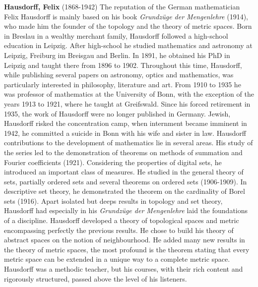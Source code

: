 \textbf{Hausdorff, Felix} (1868-1942) The reputation of the German mathematician Felix Hausdorff is mainly based on his book \textit{Grundzüge der Mengenlehre} (1914), who made him the founder of the topology and the theory of metric spaces. Born in Breslau in a wealthy merchant family, Hausdorff followed a high-school education in Leipzig. After high-school he studied mathematics and astronomy at Leipzig, Freiburg im Breisgau and Berlin. In 1891, he obtained his PhD in Leipzig and taught there from 1896 to 1902. Throughout this time, Hausdorff, while publishing several papers on astronomy, optics and mathematics, was particularly interested in philosophy, literature and art. From 1910 to 1935 he was professor of mathematics at the University of Bonn, with the exception of the years 1913 to 1921, where he taught at Greifswald. Since his forced retirement in 1935, the work of Hausdorff were no longer published in Germany. Jewish, Hausdorff risked the concentration camp, when internment became imminent in 1942, he committed a suicide in Bonn with his wife and sister in law. Hausdorff contributions to the development of mathematics lie in several areas. His study of the series led to the demonstration of theorems on methods of summation and Fourier coefficients (1921). Considering the properties of digital sets, he introduced an important class of measures. He studied in the general theory of sets, partially ordered sets and several theorems on ordered sets (1906-1909). In descriptive set theory, he demonstrated the theorem on the cardinality of Borel sets (1916). Apart isolated but deeps results in topology and set theory, Hausdorff had especially in his \textit{Grundzüge der Mengenlehre} laid the foundations of a discipline. Hausdorff developed a theory of topological spaces and metric encompassing perfectly the previous results. He chose to build his theory of abstract spaces on the notion of neighbourhood. He added many new results in the theory of metric spaces, the most profound is the theorem stating that every metric space can be extended in a unique way to a complete metric space. Hausdorff was a methodic teacher, but his courses, with their rich content and rigorously structured, passed above the level of his listeners.

